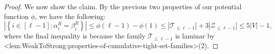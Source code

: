 \documentclass{article}
\def\Cref#1{<#1>}%
\newcommand{\cumulativeMaximalTightSetFamily}[1]{\ensuremath{\calT_{\leq #1}}}
\newcommand{\cumulativeZeros}[1]{\ensuremath{\calZ_{\leq #1}}\xspace}
\providecommand{\Z}{\mathbb{Z}}
\providecommand{\calT}{\mathcal{T}}
\providecommand{\calZ}{\mathcal{Z}}
\begin{document}
\begin{proof}
We now show the claim. By the previous two properties of our potential function $\phi$, we have the following:
$$\left|\left\{i \in [\ell - 1] : \alpha_i^R = \beta_i^R\right\}\right| \leq \phi(\ell - 1) - \phi(1) \leq |\cumulativeMaximalTightSetFamily{\ell - 1}| + 3|\cumulativeZeros{\ell - 1}| \leq 5|V| - 1,$$
where the final inequality is because the family $\cumulativeMaximalTightSetFamily{\ell - 1}$ is laminar by \Cref{lem:WeakToStrong:properties-of-cumulative-tight-set-families}(2).
\end{proof}

\end{document}
